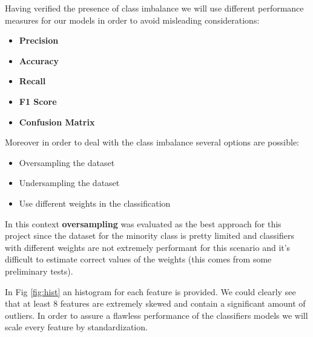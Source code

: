 \documentclass[a4paper,12pt]{article}
\begin{document}
\noindent Having verified the presence of class imbalance we will use different performance measures for our models in order to avoid misleading considerations:
\bigbreak
\begin{itemize}
  \item \textbf{Precision}
  \item \textbf{Accuracy} 
  \item \textbf{Recall}
  \item \textbf{F1 Score}
  \item \textbf{Confusion Matrix}
\end{itemize}

\bigbreak
\noindent
Moreover in order to deal with the class imbalance several options are possible:
\begin{itemize}
  \item Oversampling the dataset 
  \item Undersampling the dataset
  \item Use different weights in the classification
\end{itemize}
\bigbreak
\noindent In this context \textbf{oversampling} was evaluated as the best approach for this project since the dataset for the minority class is pretty limited and classifiers with different weights are not extremely performant for this scenario and it's difficult to estimate correct values of the weights (this comes from some preliminary tests).

\bigbreak
\noindent In Fig \ref{fig:hist} an histogram for each feature is provided. We could clearly see that at least 8 features are extremely skewed and contain a significant amount of outliers. In order to assure a flawless performance of the classifiers models we will scale every feature by standardization.
\end{document}
